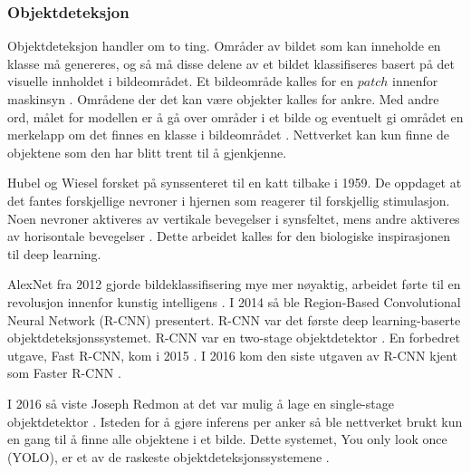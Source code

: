 \subsubsection{Objektdeteksjon}

Objektdeteksjon handler om to ting. Områder av bildet som kan inneholde en klasse må genereres, og så må disse delene av et bildet klassifiseres basert på det visuelle innholdet i bildeområdet. Et bildeområde kalles for en $patch$ innenfor maskinsyn \cite{LeCun m.fl. 1998 s. 23}. Områdene der det kan være objekter kalles for ankre. Med andre ord, målet for modellen er å gå over områder i et bilde og eventuelt gi området en merkelapp om det finnes en klasse i bildeområdet \cite{Jordan 2018}. Nettverket kan kun finne de objektene som den har blitt trent til å gjenkjenne.

Hubel og Wiesel forsket på synssenteret til en katt tilbake i 1959. De oppdaget at det fantes forskjellige nevroner i hjernen som reagerer til forskjellig stimulasjon. Noen nevroner aktiveres av vertikale bevegelser i synsfeltet, mens andre aktiveres av horisontale bevegelser \cite{Hubel og Wiesel 1959 s. 582}. Dette arbeidet kalles for den biologiske inspirasjonen til deep learning.  %


AlexNet fra 2012 gjorde bildeklassifisering mye mer nøyaktig, arbeidet førte til en revolusjon innenfor kunstig intelligens \cite{Canziani m.fl. 2017 s. 1}. I 2014 så ble Region-Based Convolutional Neural Network (R-CNN) presentert. R-CNN var det første deep learning-baserte objektdeteksjonssystemet. R-CNN var en two-stage objektdetektor \cite{Girshick m.fl. 2014 s. 1}. En forbedret utgave, Fast R-CNN, kom i 2015 \cite{Girshick 2015}. I 2016 kom den siste utgaven av R-CNN kjent som Faster R-CNN \cite{Ren m.fl. 2016}.

I 2016 så viste Joseph Redmon at det var mulig å lage en single-stage objektdetektor \cite{Redmon 2016}. Isteden for å gjøre inferens per anker så ble nettverket brukt kun en gang til å finne alle objektene i et bilde. Dette systemet, You only look once (YOLO), er et av de raskeste objektdeteksjonssystemene \cite{Redmon 2018}. 

